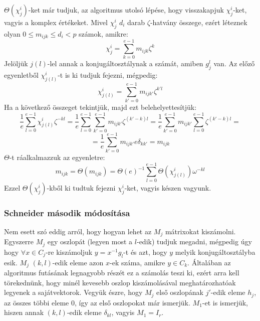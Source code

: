 $\Theta(\chi^i_j)$-ket már tudjuk, az algoritmus utolsó lépése, hogy visszakapjuk $\chi^i_j$-ket, vagyis a komplex értékeket.
Mivel $\chi^i_j$ $d_i$ darab $\zeta$-hatvány összege, ezért léteznek olyan $0\le m_{ijk}\le d_i < p$ számok, amikre:
\begin{equation}
\label{eq:bdsmijk1}
\chi^i_j = \sum_{k=0}^{e-1} m_{ijk}\zeta^k
\end{equation}
Jelöljük $j(l)$-lel annak a konjugáltosztálynak a számát, amiben $g_j^l$ van. Az előző egyenletből $\chi^i_{j(l)}$-t is ki tudjuk fejezni, mégpedig:
\begin{equation}
\label{eq:bdsmijk2}
\chi^i_{j(l)} = \sum_{k'=0}^{e-1} m_{ijk'}\zeta^{k'l}
\end{equation}
Ha a következő összeget tekintjük, majd ezt belehelyettesítjük:
\begin{equation*}
\label{eq:bdsmijk3a}
\frac{1}{e}\sum_{l=0}^{e-1} \chi^i_{j(l)} \zeta^{-kl} =
\frac{1}{e}\sum_{l=0}^{e-1} \sum_{k'=0}^{e-1} m_{ijk'}\zeta^{(k'-k)l} =
\frac{1}{e}\sum_{k'=0}^{e-1} m_{ijk'} \sum_{l=0}^{e-1} \zeta^{(k'-k)l} =
\end{equation*}
\begin{equation}
\label{eq:bdsmijk3b}
= \frac{1}{e}\sum_{k'=0}^{e-1} m_{ijk'} e \delta_{kk'} = m_{ijk}
\end{equation}
$\Theta$-t ráalkalmazzuk az egyenletre:
\begin{equation}
\label{eq:bdsmijk4}
m_{ijk} = \Theta(m_{ijk}) = \Theta(e)^{-1} \sum_{l=0}^{e-1} \Theta(\chi^i_{j(l)}) \omega^{-kl}
\end{equation}
Ezzel $\Theta(\chi^i_j)$-kből ki tudtuk fejezni $\chi^i_j$-ket, vagyis készen vagyunk.

\subsubsection{Schneider második módosítása}
\label{subsubsec:bdssch2}
Nem esett szó eddig arról, hogy hogyan lehet az $M_j$ mátrixokat kiszámolni.
Egyszerre $M_j$ egy oszlopát (legyen most a $l$-edik) tudjuk megadni, mégpedig úgy hogy $\forall x \in C_j$-re kiszámoljuk
$y=x^{-1}g_l$-t és azt, hogy $y$ melyik konjugáltosztályba esik.
$M_j$ $(k,l)$-edik eleme azon $x$-ek száma, amikre $y\in C_k$.
Általában az algoritmus futásának legnagyobb részét ez a számolás teszi ki, ezért arra kell törekednünk, hogy minél kevesebb oszlop kiszámolásával meghatározhatóak legyenek a sajátvektorok.
Vegyük észre, hogy $M_j$ első oszlopának $j'$-edik eleme $h_j$, az összes többi eleme $0$, így az első oszlopokat már ismerjük.
$M_1$-et is ismerjük, hiszen annak $(k,l)$-edik eleme $\delta_{kl}$, vagyis $M_1=I_r$.

